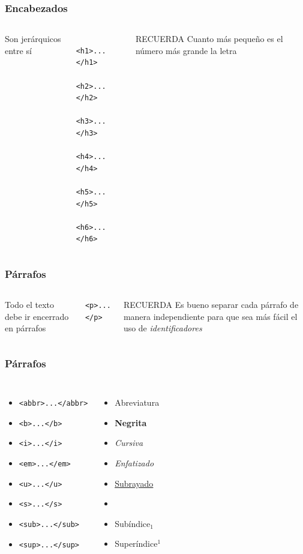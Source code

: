 \documentclass{beamer}
\begin{document}
\begin{frame}[fragile]
\frametitle{Encabezados}
	\begin{columns}[c]
	Son jerárquicos entre sí
	\begin{verbatim}
	<h1>...</h1>
	<h2>...</h2>
	<h3>...</h3>
	<h4>...</h4>
	<h5>...</h5>
	<h6>...</h6>
	\end{verbatim}
	\begin{exampleblock}{RECUERDA}
	Cuanto más pequeño es el número más grande la letra
	\end{exampleblock}
	\end{columns}
\end{frame}

\begin{frame}[fragile]
\frametitle{Párrafos}
	\begin{columns}[c]
	Todo el texto debe ir encerrado en párrafos
	\newline
	
	\verb|<p>...</p>|
	\begin{exampleblock}{RECUERDA}
	Es bueno separar cada párrafo de manera independiente para que sea más fácil el uso de \textit{identificadores}
	\end{exampleblock}
	\end{columns}
\end{frame}

\begin{frame}[fragile]
\frametitle{Párrafos}
	\begin{columns}[c]
	\begin{itemize}
	\item \verb|<abbr>...</abbr>|
	\item \verb|<b>...</b>|
	\item \verb|<i>...</i>|
	\item \verb|<em>...</em>|
	\item \verb|<u>...</u>|
	\item \verb|<s>...</s>|
	\item \verb|<sub>...</sub>|
	\item \verb|<sup>...</sup>|
	\end{itemize}
	\begin{itemize}
	\item Abreviatura
	\item \textbf{Negrita}
	\item \textit{Cursiva}
	\item \emph{Enfatizado}
	\item \underline{Subrayado}
	\item {}
	\item Subíndice$_1$
	\item Superíndice$^1$
	\end{itemize}
	\end{columns}
\end{frame}
\end{document}
